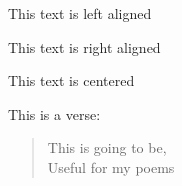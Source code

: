 \documentclass[a4paper,12pt,titlepage]{article} %
\begin{document}
	\begin{flushleft}
		This text is left aligned
	\end{flushleft}

	\begin{flushright}
		This text is right aligned
	\end{flushright}		
	
	\begin{center}
		This text is centered
	\end{center}		
	
	This is a verse:
	\begin{verse}
		This is going to be,\\
		Useful for my poems
	\end{verse}
	
		
\end{document}
